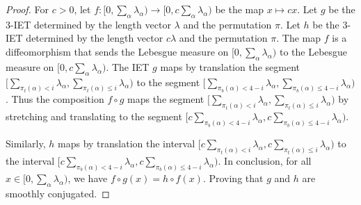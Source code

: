 \documentclass[oneside]{amsart}
\theoremstyle{plain}
\theoremstyle{definition}
\newcommand{\<}{\langle}
\renewcommand{\>}{\rangle}
\renewcommand{\|}{|\!|} %
\begin{document}
\begin{proof}[Proof] 
    For $c>0$, let $f:[0,\sum_{\alpha} \lambda_\alpha)\to[0,c\sum_{\alpha} \lambda_\alpha) $ be the map $x \mapsto cx.$ Let $g$ be the 3-IET determined by the length vector $\lambda$ and the permutation $\pi$. Let $h$ be the 3-IET determined by the length vector $c\lambda$ and the permutation $\pi.$
    The map $f$ is a diffeomorphism that sends the Lebesgue measure on $[0,\sum_{\alpha} \lambda_\alpha)$ to the Lebesgue measure on $[0,c\sum_{\alpha} \lambda_\alpha)$.
    The IET $g$ maps by translation the segment $[\sum_{\pi_t(\alpha)<i}\lambda_\alpha,\sum_{\pi_t(\alpha)\le i}\lambda_\alpha)$ to the segment $[\sum_{\pi_b(\alpha)<4-i}\lambda_\alpha,\sum_{\pi_b(\alpha)\le 4-i}\lambda_\alpha)$. Thus the composition $f\circ g$ maps the segment $[\sum_{\pi_t(\alpha)<i}\lambda_\alpha,\sum_{\pi_t(\alpha)\le i}\lambda_\alpha)$ by stretching and translating to the segment $[c\sum_{\pi_b(\alpha)<4-i}\lambda_\alpha,c\sum_{\pi_b(\alpha)\le 4-i}\lambda_\alpha)$.

    Similarly, $h$ maps by translation the interval $[c\sum_{\pi_t(\alpha)<i}\lambda_\alpha,c\sum_{\pi_t(\alpha)\le i}\lambda_\alpha)$ to the interval $[c\sum_{\pi_b(\alpha)<4-i}\lambda_\alpha,c\sum_{\pi_b(\alpha)\le 4-i}\lambda_\alpha).$ In conclusion, for all $x \in [0,\sum_{\alpha}\lambda_\alpha)$, we have $f\circ g(x) = h \circ f(x).$ Proving that $g$ and $h$ are smoothly conjugated.


\end{proof}
\end{document}
